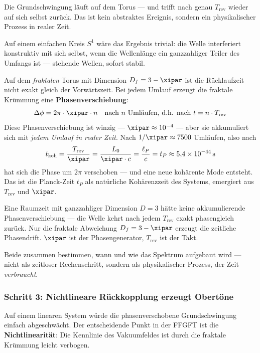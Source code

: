Die Grundschwingung läuft auf dem Torus — und trifft nach genau $T_\text{rev}$
wieder auf sich selbst zurück. Das ist kein abstraktes Ereignis, sondern ein
physikalischer Prozess in realer Zeit.

Auf einem einfachen Kreis $S^1$ wäre das Ergebnis trivial: die Welle
interferiert konstruktiv mit sich selbst, wenn die Wellenlänge ein ganzzahliger
Teiler des Umfangs ist — stehende Wellen, sofort stabil.

Auf dem \emph{fraktalen} Torus mit Dimension $D_f = 3 - \xipar$ ist die
Rücklaufzeit nicht exakt gleich der Vorwärtszeit. Bei jedem Umlauf erzeugt
die fraktale Krümmung eine \textbf{Phasenverschiebung}:
\begin{equation}
    \Delta\phi = 2\pi \cdot \xipar \cdot n
    \quad \text{nach } n \text{ Umläufen, d.h. nach } t = n \cdot T_\text{rev}
\end{equation}
Diese Phasenverschiebung ist winzig — $\xipar \approx 10^{-4}$ — aber sie
akkumuliert sich mit \emph{jedem Umlauf in realer Zeit}. Nach
$1/\xipar \approx 7500$ Umläufen, also nach
\begin{equation}
    t_\text{koh} = \frac{T_\text{rev}}{\xipar} = \frac{L_0}{\xipar \cdot c}
    = \frac{\ell_P}{c} = t_P \approx 5{,}4 \times 10^{-44}\,\text{s}
\end{equation}
hat sich die Phase um $2\pi$ verschoben — und eine neue kohärente Mode entsteht.
Das ist die Planck-Zeit $t_P$ als natürliche Kohärenzzeit des Systems, emergiert
aus $T_\text{rev}$ und $\xipar$.

\begin{technical}
Eine Raumzeit mit ganzzahliger Dimension $D = 3$ hätte keine akkumulierende
Phasenverschiebung — die Welle kehrt nach jedem $T_\text{rev}$ exakt phasengleich
zurück. Nur die fraktale Abweichung $D_f = 3 - \xipar$ erzeugt die zeitliche
Phasendrift. $\xipar$ ist der Phasengenerator, $T_\text{rev}$ ist der Takt.

Beide zusammen bestimmen, wann und wie das Spektrum aufgebaut wird — nicht
als zeitloser Rechenschritt, sondern als physikalischer Prozess, der Zeit
\emph{verbraucht}.
\end{technical}

\subsubsection*{Schritt 3: Nichtlineare Rückkopplung erzeugt Obertöne}

Auf einem linearen System würde die phasenverschobene Grundschwingung
einfach abgeschwächt. Der entscheidende Punkt in der FFGFT ist die
\textbf{Nichtlinearität}: Die Kennlinie des Vakuumfeldes ist durch die
fraktale Krümmung leicht verbogen.

